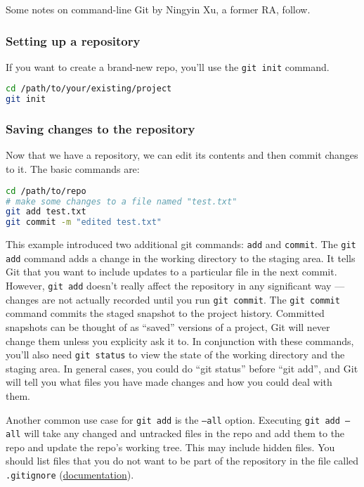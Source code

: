 Some notes on command-line Git by Ningyin Xu, a former RA, follow.

\subsubsection{Setting up a repository}

If you want to create a brand-new repo, you'll use the \texttt{git init} command.
\begin{lstlisting}[language=bash]
cd /path/to/your/existing/project
git init
\end{lstlisting}

\subsubsection{Saving changes to the repository}
Now that we have a repository, we can edit its contents and then commit changes to it.
The basic commands are:
\begin{lstlisting}[language=bash]
cd /path/to/repo
# make some changes to a file named "test.txt"
git add test.txt
git commit -m "edited test.txt"
\end{lstlisting}
This example introduced two additional git commands: \texttt{add} and \texttt{commit}.
The \texttt{git add} command adds a change in the working directory to the staging area.
It tells Git that you want to include updates to a particular file in the next commit.
However, \texttt{git add} doesn't really affect the repository in any significant way — changes are not actually recorded until you run \texttt{git commit}.
The \texttt{git commit} command commits the staged snapshot to the project history.
Committed snapshots can be thought of as ``saved'' versions of a project, Git will never change them unless you explicity ask it to.
In conjunction with these commands, you'll also need \texttt{git status} to view the state of the working directory and the staging area.
In general cases, you could do ``git status'' before ``git add'', and Git will tell you what files you have made changes and how you could deal with them.

Another common use case for \texttt{git add} is the \texttt{--all} option.
Executing \texttt{git add --all} will take any changed and untracked files in the repo and
add them to the repo and update the repo's working tree.
This may include hidden files.
You should list files that you do not want to be part of the repository in the file called \texttt{.gitignore} (\href{https://git-scm.com/docs/gitignore}{documentation}).


